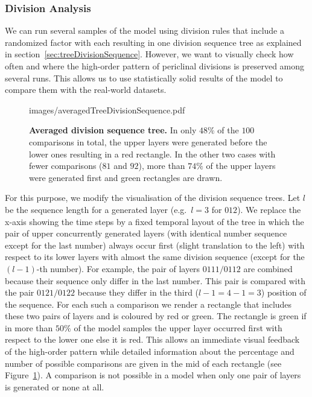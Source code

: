 \documentclass[11pt,a4paper, final]{article}
\begin{document}
\subsubsection{Division Analysis}
\noindent
We can run several samples of the model using division rules that include a randomized factor with each resulting in one division sequence tree as explained in section~\ref{sec:treeDivisionSequence}. However, we want to visually check how often and where the high-order pattern of periclinal divisions is preserved among several runs. This allows us to use statistically solid results of the model to compare them with the real-world datasets.
%
\begin{figure}[htbp]
	\begin{center}
		\begin{overpic}[width=0.4\linewidth]{images/averagedTreeDivisionSequence.pdf}
		\end{overpic}
\caption[Averaged division sequence tree.]
{
{\bf Averaged division sequence tree.} In only $48 \%$ of the $100$ comparisons in total, the upper layers were generated before the lower ones resulting in a red rectangle. In the other two cases with fewer comparisons ($81$ and $92$), more than $74 \%$ of the upper layers were generated first and green rectangles are drawn.
}
	\label{fig:averagedTreeDivisionSequence}
	\end{center}
\end{figure}
%
For this purpose, we modify the visualisation of the division sequence trees. Let $l$ be the sequence length for a generated layer (e.g.\ $l=3$ for $012$). We replace the x-axis showing the time steps by a fixed temporal layout of the tree in which the pair of upper concurrently generated layers (with identical number sequence except for the last number) always occur first (slight translation to the left) with respect to its lower layers with almost the same division sequence (except for the $(l-1)$-th number). For example, the pair of layers $0111/0112$ are combined because their sequence only differ in the last number. This pair is compared with the pair $0121/0122$ because they differ in the third ($l-1 = 4-1 = 3$) position of the sequence. For each such a comparison we render a rectangle that includes these two pairs of layers and is coloured by red or green. The rectangle is green if in more than $50 \%$ of the model samples the upper layer occurred first with respect to the lower one else it is red. This allows an immediate visual feedback of the high-order pattern while detailed information about the percentage and number of possible comparisons are given in the mid of each rectangle (see Figure~\ref{fig:averagedTreeDivisionSequence}). A comparison is not possible in a model when only one pair of layers is generated or none at all.
\end{document}

